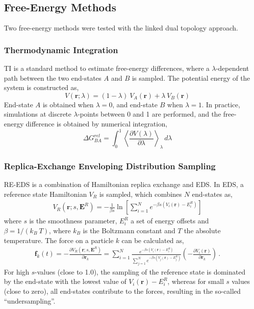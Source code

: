 \FloatBarrier

\subsection{Free-Energy Methods}
Two free-energy methods were tested with the linked dual topology approach.

\subsubsection{Thermodynamic Integration}
TI is a standard method to estimate free-energy differences,\cite{Kirkwood1935} where a $\lambda$-dependent path between the two end-states $A$ and $B$ is sampled. The potential energy of the system is constructed as,
\begin{equation}
    V(\textbf{r}; \lambda) = (1-\lambda) ~ V_A(\textbf{r}) + \lambda ~ V_B(\textbf{r})
    \label{eq: TI-Potential}
\end{equation}
End-state $A$ is obtained when $\lambda = 0$, and end-state $B$ when $\lambda = 1$. In practice, simulations at discrete $\lambda$-points between 0 and 1 are performed, and the free-energy difference is obtained by numerical integration,
\begin{equation}
    \Delta G^{rel}_{BA} = \int^{1}_{0} \left< \frac{\partial V(\lambda)}{\partial \lambda} \right>_{\lambda} \,d\lambda
    \label{eq: TI-Integration}
\end{equation}

\subsubsection{Replica-Exchange Enveloping Distribution Sampling}
RE-EDS\cite{Sidler2016,Sidler2017,Ries2021B} is a combination of Hamiltonian replica exchange\cite{Hansmann1997,Sugita2000} and EDS.\cite{Christ2007,Christ2008} In EDS, a reference state Hamiltonian $V_R$ is sampled, which combines $N$ end-states as,
\begin{align}
    V_R\left(\textbf{r};s,\textbf{E}^R\right) = -\frac{1}{\beta s}\ln\left[\sum\limits_{i=1}^N e^{-\beta s\left(V_i(\textbf{r})-E_i^R\right)}\right]
\end{align}
where $s$ is the smoothness parameter, $E_i^R$ a set of energy offsets and $\beta=1/(k_B~T)$, where $k_B$ is the Boltzmann constant and $T$ the absolute temperature. 
The force on a particle $k$ can be calculated as, \cite{Christ2007,Christ2008}
\begin{align}
    \textbf{f}_k(t)=-\frac{\partial V_R(\textbf{r}; s, \textbf{E}^R)}{\partial \textbf{r}_k} = \sum^N_{i=1}\frac{e^{-\beta s(V_i(\textbf{r}) -E_i^R)}}{\sum^N_{j=1}{e^{-\beta s (V_j(\textbf{r})-E_j^R)}}}  \left( -\frac{\partial V_i(\textbf{r})}{\partial \textbf{r}_k} \right) \,.
\end{align}
For high $s$-values (close to 1.0), the sampling of the reference state is dominated by the end-state with the lowest value of $V_i(\textbf{r}) - E_i^R$, whereas for small $s$ values (close to zero), all end-states contribute to the forces, resulting in the so-called ``undersampling''.\cite{Riniker2011} 

